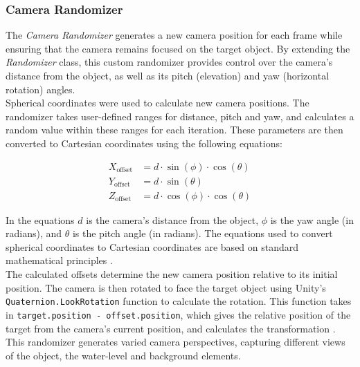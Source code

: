\subsubsection{Camera Randomizer}
The \textit{Camera Randomizer} generates a new camera position for each frame while ensuring that the camera remains focused on the target object. By extending the \textit{Randomizer} class, this custom randomizer provides control over the camera's distance from the object, as well as its pitch (elevation) and yaw (horizontal rotation) angles. \\

\noindent Spherical coordinates were used to calculate new camera positions. The randomizer takes user-defined ranges for distance, pitch and yaw, and calculates a random value within these ranges for each iteration. These parameters are then converted to Cartesian coordinates using the following equations:

\begin{align}
X_{\text{offset}} &= d \cdot \sin(\phi) \cdot \cos(\theta) \\
Y_{\text{offset}} &= d \cdot \sin(\theta) \\
Z_{\text{offset}} &= d \cdot \cos(\phi) \cdot \cos(\theta)
\end{align}

\noindent In the equations \(d\) is the camera's distance from the object, \(\phi\) is the yaw angle (in radians), and \(\theta\) is the pitch angle (in radians). The equations used to convert spherical coordinates to Cartesian coordinates are based on standard mathematical principles \cite{wolfram_spherical_coordinates}.\\

\noindent The calculated offsets determine the new camera position relative to its initial position. The camera is then rotated to face the target object using Unity's \texttt{Quaternion.LookRotation} function to calculate the rotation. This function takes in \texttt{target.position - offset.position}, which gives the relative position of the target from the camera's current position, and calculates the transformation \cite{unity_quaternion_lookrotation}. This randomizer generates varied camera perspectives, capturing different views of the object, the water-level and background elements.

